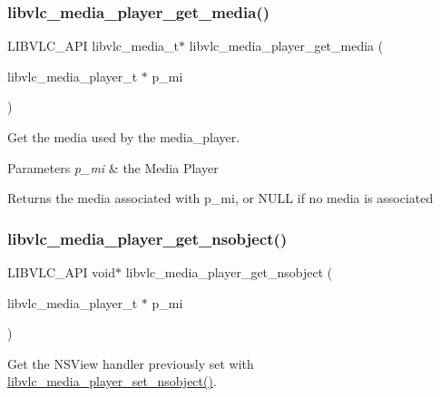 \subsubsection{\texorpdfstring{libvlc\+\_\+media\+\_\+player\+\_\+get\+\_\+media()}{libvlc\_media\_player\_get\_media()}}
{\footnotesize\ttfamily L\+I\+B\+V\+L\+C\+\_\+\+A\+PI libvlc\+\_\+media\+\_\+t$\ast$ libvlc\+\_\+media\+\_\+player\+\_\+get\+\_\+media (\begin{DoxyParamCaption}\item[{libvlc\+\_\+media\+\_\+player\+\_\+t $\ast$}]{p\+\_\+mi }\end{DoxyParamCaption})}

Get the media used by the media\+\_\+player.


\begin{DoxyParams}{Parameters}
{\em p\+\_\+mi} & the Media Player \\
\hline
\end{DoxyParams}
\begin{DoxyReturn}{Returns}
the media associated with p\+\_\+mi, or N\+U\+LL if no media is associated 
\end{DoxyReturn}
\mbox{\label{group__libvlc__media__player_gac331dd7523df7c754d6ce4bb3cdb7e08}} 
\subsubsection{\texorpdfstring{libvlc\+\_\+media\+\_\+player\+\_\+get\+\_\+nsobject()}{libvlc\_media\_player\_get\_nsobject()}}
{\footnotesize\ttfamily L\+I\+B\+V\+L\+C\+\_\+\+A\+PI void$\ast$ libvlc\+\_\+media\+\_\+player\+\_\+get\+\_\+nsobject (\begin{DoxyParamCaption}\item[{libvlc\+\_\+media\+\_\+player\+\_\+t $\ast$}]{p\+\_\+mi }\end{DoxyParamCaption})}

Get the N\+S\+View handler previously set with \hyperlink{group__libvlc__media__player_ga46c26a395b496e48917101198acc31f6}{libvlc\+\_\+media\+\_\+player\+\_\+set\+\_\+nsobject()}.



